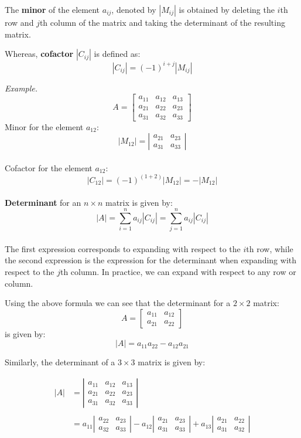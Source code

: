 \documentclass{./../../latex/handout}
\begin{document}
The \textbf{minor} of the element $a_{ij}$, denoted by $|M_{ij}|$ is obtained by deleting the $i$th row and $j$th column of the matrix and taking the determinant of the resulting matrix. 

Whereas, \textbf{cofactor} $|C_{ij}|$ is defined as:
\[ |C_{ij}| = (-1)^{i+j} |M_{ij}| \]

\textit{Example.} \[
A=\left[\begin{array}{lll}
a_{11} & a_{12} & a_{13} \\
a_{21} & a_{22} & a_{23} \\
a_{31} & a_{32} & a_{33}
\end{array}\right]
\]
Minor for the element $a_{12}$: 
\[ \left|M_{12}\right|=\left|\begin{array}{ll}a_{21} & a_{23} \\ a_{31} & a_{33}\end{array}\right| \] \\
Cofactor for the element $a_{12}$: 
\[ \left|C_{12}\right| = (-1)^{(1+2)}  \left|M_{12}\right| = -  \left|M_{12}\right| \] \\

\textbf{Determinant} for an  $n \times n$ matrix is given by:
 \[|A| = \sum_{i=1}^n a_{ij} |C_{ij}| = \sum_{j=1}^n a_{ij} |C_{ij}| \] \\
The first expression corresponds to expanding with respect to the $i$th row, while the second expression is the expression for the determinant when expanding with respect to the $j$th column. In practice, we can expand with respect to any row or column. 

Using the above formula we can see that the determinant for a $2 \times 2$ matrix:
 \[ A=\left[\begin{array}{ll}a_{11} & a_{12} \\ a_{21} & a_{22}\end{array}\right] \]
 is given by: \[ |A|=a_{11} a_{22}-a_{12} a_{21} \]                
 
 Similarly, the determinant of a $3 \times 3$ matrix is given by:

 \[
\begin{aligned}
|A| &=\left|\begin{array}{lll}
a_{11} & a_{12} & a_{13} \\
a_{21} & a_{22} & a_{23} \\
a_{31} & a_{32} & a_{33}
\end{array}\right| \\~\\
&=a_{11}\left|\begin{array}{ll}
a_{22} & a_{23} \\
a_{32} & a_{33}
\end{array}\right|-a_{12}\left|\begin{array}{ll}
a_{21} & a_{23} \\
a_{31} & a_{33}
\end{array}\right| 
+a_{13}\left|\begin{array}{ll}
a_{21} & a_{22} \\
a_{31} & a_{32}
\end{array}\right|
\end{aligned}
\] \\
\end{document}
